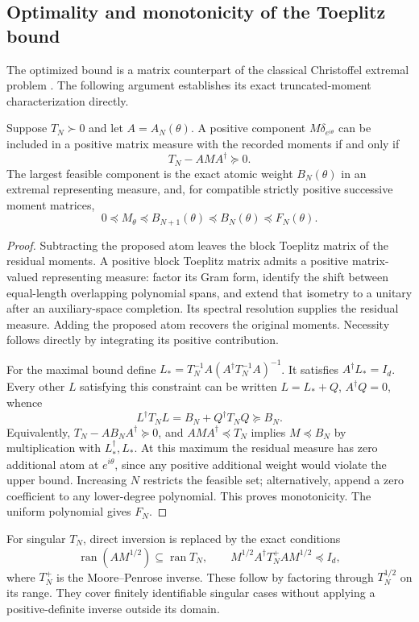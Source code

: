 \subsection{Optimality and monotonicity of the Toeplitz bound}
The optimized bound is a matrix counterpart of the classical Christoffel extremal problem \cite{Simon05}. The following argument establishes its exact truncated-moment characterization directly.
\begin{proposition}\label{prop:sharp}
Suppose $T_N\succ0$ and let $A=A_N(\theta)$. A positive component $M\delta_{e^{i\theta}}$ can be included in a positive matrix measure with the recorded moments if and only if
\[
T_N-AMA^\dagger\succeq0.
\]
The largest feasible component is the exact atomic weight $B_N(\theta)$ in an extremal representing measure, and, for compatible strictly positive successive moment matrices,
\begin{equation}\label{eq:nested-bounds}
0\preceq M_\theta\preceq B_{N+1}(\theta)\preceq B_N(\theta)\preceq F_N(\theta).
\end{equation}
\end{proposition}
\begin{proof}
Subtracting the proposed atom leaves the block Toeplitz matrix of the residual moments. A positive block Toeplitz matrix admits a positive matrix-valued representing measure: factor its Gram form, identify the shift between equal-length overlapping polynomial spans, and extend that isometry to a unitary after an auxiliary-space completion. Its spectral resolution supplies the residual measure. Adding the proposed atom recovers the original moments. Necessity follows directly by integrating its positive contribution.

For the maximal bound define $L_*=T_N^{-1}A(A^\dagger T_N^{-1}A)^{-1}$. It satisfies $A^\dagger L_*=I_d$. Every other $L$ satisfying this constraint can be written $L=L_*+Q$, $A^\dagger Q=0$, whence
\[
L^\dagger T_NL=B_N+Q^\dagger T_NQ\succeq B_N.
\]
Equivalently, $T_N-AB_NA^\dagger\succeq0$, and $AMA^\dagger\preceq T_N$ implies $M\preceq B_N$ by multiplication with $L_*^\dagger,L_*$. At this maximum the residual measure has zero additional atom at $e^{i\theta}$, since any positive additional weight would violate the upper bound. Increasing $N$ restricts the feasible set; alternatively, append a zero coefficient to any lower-degree polynomial. This proves monotonicity. The uniform polynomial gives $F_N$.
\end{proof}
For singular $T_N$, direct inversion is replaced by the exact conditions
\[
\operatorname{ran}(AM^{1/2})\subseteq\operatorname{ran}T_N,
\qquad M^{1/2}A^\dagger T_N^+AM^{1/2}\preceq I_d,
\]
where $T_N^+$ is the Moore--Penrose inverse. These follow by factoring through $T_N^{1/2}$ on its range. They cover finitely identifiable singular cases without applying a positive-definite inverse outside its domain.

